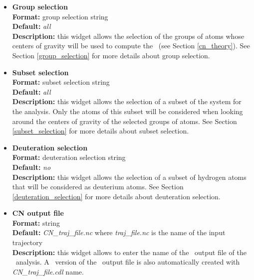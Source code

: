 \documentclass[a4paper,11pt]{report}
\newcommand{\nm}{\textit{nm}}
\begin{document}
\begin{itemize}
For example,
\begin{itemize}
\item \textit{0:10:1} will compute \PDF\ for \textit{r = 0, 1, 2, 3, 4, 5, 6, 7, 8, 9, 10} \nm .
\item \textit{3:7:1.2} will compute \PDF\ for \textit{r = 3, 4.2, 5.4, 6.6} \nm .
\end{itemize}
\newpage
\hypertarget{cn_group_selection}{}
\item \textbf{Group selection}\\
\textbf{Format:} group selection string\\
\textbf{Default:} \textit{all}\\
\textbf{Description:} this widget allows the selection of the groups of atoms whose centers of gravity will be used to compute 
the \CN\ (see Section \ref{cn_theory}). See Section \ref{group_selection} for more details about group selection.

\hypertarget{cn_subset_selection}{}
\item \textbf{Subset selection}\\
\textbf{Format:} subset selection string\\
\textbf{Default:} \textit{all}\\
\textbf{Description:} this widget allows the selection of a subset of the system for the analysis. Only the atoms 
of this subset will be considered when looking around the centers of gravity of the selected groups of atoms. 
See Section \ref{subset_selection} for more details about subset selection.

\hypertarget{cn_deuteration_selection}{}
\item \textbf{Deuteration selection}\\
\textbf{Format:} deuteration selection string\\
\textbf{Default:} \textit{no}\\
\textbf{Description:} this widget allows the selection of a subset of hydrogen atoms that will be considered as 
deuterium atoms. See Section \ref{deuteration_selection} for more details about deuteration selection.

\hypertarget{cn_cn_output_file}{}
\item \textbf{CN output file}\\
\textbf{Format:} string\\
\textbf{Default:} \textit{CN\_traj\_file.nc} where \textit{traj\_file.nc} is the name of the input trajectory\\
\textbf{Description:} this widget allows to enter the name of the \NetCDF\ output file of the \CN\ analysis. A \CDL\ 
version of the \NetCDF\ output file is also automatically created with \textit{CN\_traj\_file.cdl} name.
\end{itemize}
\end{document}
